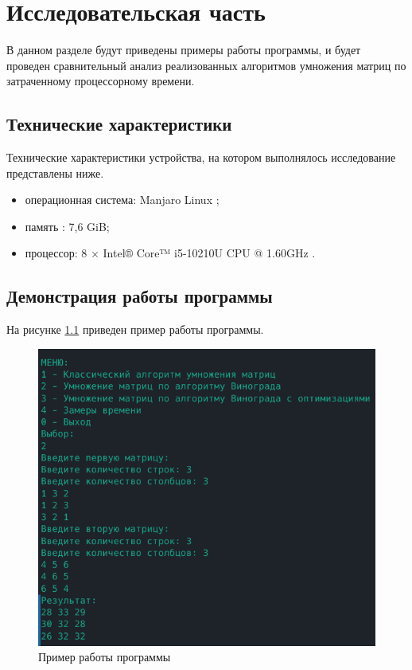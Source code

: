 \chapter{Исследовательская часть}

В данном разделе будут приведены примеры работы программы, и будет проведен сравнительный анализ реализованных алгоритмов умножения матриц по затраченному процессорному времени.

\section{Технические характеристики}

Технические характеристики устройства, на котором выполнялось исследование представлены ниже.

\begin{itemize}
	\item операционная система: Manjaro Linux \cite{manjaro};
	\item память : 7,6 GiB;
	\item процессор: 8 × Intel® Core™ i5-10210U CPU @ 1.60GHz \cite{intel}.
\end{itemize}

\clearpage

\section{Демонстрация работы программы}

На рисунке \ref{img:example} приведен пример работы программы.

\begin{figure}[H]
	\begin{center}
		\includegraphics[scale=0.7]{img/example.png}
	\end{center}
	\captionsetup{justification=centering}
	\caption{Пример работы программы}
	\label{img:example}
\end{figure}

